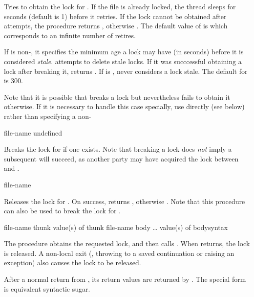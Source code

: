 \begin{desc}
  Tries to obtain the lock for . If the file is already
  locked, the thread sleeps for  seconds (default is 1)
  before it retries. If the lock cannot be obtained after
   attempts, the procedure returns \sharpf,
  otherwise \sharpt. The default value of  is
  \sharpf{} which corresponds to an infinite number of retires.
  
  If  is non-\sharpf, it specifies the minimum age a
  lock may have (in seconds) before it is considered \textit{stale}.
   attempts to delete stale locks.  If it was
  succcessful obtaining a lock after breaking it, 
  returns .  If  is \sharpf,
   never considers a lock stale.  The default for
     is 300.
    
    Note that it is possible that  breaks a lock
    but nevertheless fails to obtain it otherwise.  If it is necessary
    to handle this case specially, use  directly
    (see below) rather than specifying a non-\sharpf{} 
\end{desc}

 {file-name} {undefined}

\begin{desc}
  Breaks the lock for  if one exists.  Note that
  breaking a lock does \emph{not} imply a subsequent
   will succeed, as another party may have
  acquired the lock between  and
  .
\end{desc}

 {file-name} {\boolean}

\begin{desc}
  Releases the lock for . On success,
   returns \sharpt, otherwise \sharpf. Note that
  this procedure can also be used to break the lock for
  .
\end{desc}


 {file-name thunk} {value(s) of thunk}
 {file-name body \ldots} {value(s) of body}{syntax}
  
\begin{desc}
  The procedure  obtains the requested lock, and
  then calls . When  returns, the lock is
  released.  A non-local exit (\eg, throwing to a saved continuation
  or raising an exception) also causes the lock to be released.
  
  After a normal return from , its return values are
  returned by .  The  special
  form is equivalent syntactic sugar.
\end{desc}

